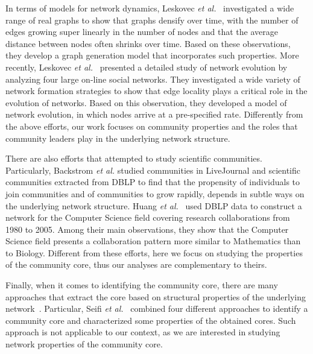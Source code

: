 \documentclass[letterpaper]{www13-companion-accepted}
\begin{document}
In terms of models for network dynamics, Leskovec \textit{et al.}~\cite{Leskovec:2005} investigated a wide range of real graphs to show that graphs densify over time, with the
number of edges growing super linearly in the number of nodes and that the average distance between nodes often shrinks over time. Based on these observations, they develop a graph
generation model that incorporates such properties.  More recently, Leskovec \textit{et al.}~\cite{Leskovec:2008} presented a detailed study of network evolution by analyzing four
large on-line social networks.  They investigated a wide variety of network formation strategies to show that edge locality plays a critical role in the evolution of networks. Based on
this observation, they developed a model of network evolution, in which nodes arrive at a pre-specified rate.  Differently from the above efforts, our work focuses on community
properties and the roles that community leaders play in the underlying network structure.

There are also efforts that attempted to study scientific communities. Particularly, Backstrom \textit{et al.}\cite{Backstrom:2006} studied communities in LiveJournal and
scientific communities extracted from DBLP to find that the propensity of individuals to join communities and of communities to grow rapidly, depends in subtle ways on the
underlying network structure. Huang \textit{et al.}~\cite{Huang:2008} used DBLP data to construct a network for the Computer Science field covering research collaborations from
1980 to 2005. Among their main observations, they show that the Computer Science field presents a collaboration pattern more similar to Mathematics than to Biology.  
Different from these efforts, here we focus on studying the properties of the community core, thus our analyses are complementary to
theirs.

Finally, when it comes to identifying the community core, there are many approaches that extract the core based on structural properties of the underlying
network~\cite{Leskovec@www2010,Chakrabarti:2006:EC:1150402.1150467,citeulike:370723,Sachan:2012}.  Particular, 
Seifi \textit{et al.}~\cite{Seifi:2012:CCE:2187980.2188258} combined four different
approaches to identify a community core and characterized some properties of the obtained cores. Such approach is not applicable to our context, as we are interested in studying
network properties of the community core. 


% 
\end{document}
